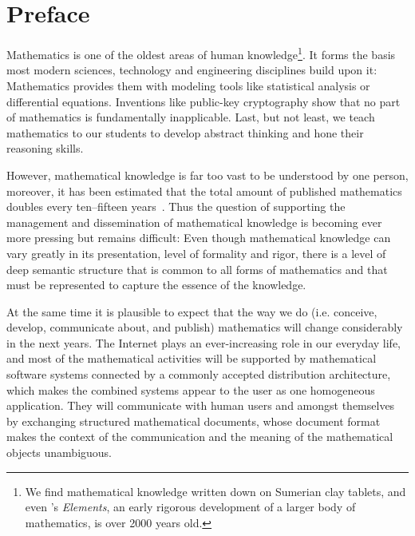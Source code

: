 
\section*{Preface}\label{sec:intro}

Mathematics is one of the oldest areas of human knowledge\footnote{We find mathematical
  knowledge written down on Sumerian clay tablets, and even
  {}'s {\emph{Elements}}, an early rigorous
  development of a larger body of mathematics, is over 2000 years old.}.  It forms the
basis most modern sciences, technology and engineering disciplines build upon
it: Mathematics provides them with modeling tools like statistical analysis or
differential equations.  Inventions like public-key cryptography show that no part of
mathematics is fundamentally inapplicable.  Last, but not least, we teach mathematics to
our students to develop abstract thinking and hone their reasoning skills.
  
However, mathematical knowledge is far too vast to be understood by one person, moreover,
it has been estimated that the total amount of published mathematics doubles every
ten--fifteen years~\cite{Odlyzko:tlogr95}. Thus the question of supporting the management
and dissemination of mathematical
knowledge
is becoming ever more pressing but remains difficult: Even though mathematical knowledge
can vary greatly in its presentation, level of formality and rigor, there is a level of
deep semantic structure that is common to all forms of mathematics and that must be
represented to capture the essence of the knowledge.

At the same time it is plausible to expect that the way we do (i.e. conceive, develop,
communicate about, and publish) mathematics will change considerably in the next years.
The Internet plays an ever-increasing role in our everyday life, and most of the
mathematical activities will be supported by mathematical software systems connected by a
commonly accepted distribution architecture, which makes the combined systems appear to the
user as one homogeneous application. They will communicate with human users and amongst
themselves by exchanging structured mathematical documents, whose document format makes
the context of the communication and the meaning of the mathematical objects unambiguous.

